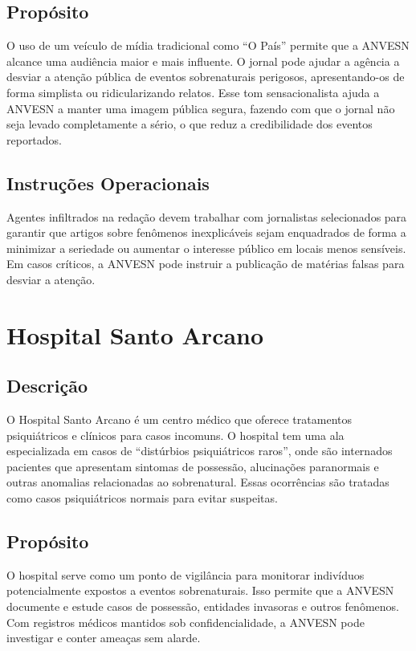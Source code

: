 \documentclass{book}
\begin{document}
\section{Propósito}
O uso de um veículo de mídia tradicional como ``O País'' permite que a ANVESN alcance uma audiência maior e mais influente. O jornal pode ajudar a agência a desviar a atenção pública de eventos sobrenaturais perigosos, apresentando-os de forma simplista ou ridicularizando relatos. Esse tom sensacionalista ajuda a ANVESN a manter uma imagem pública segura, fazendo com que o jornal não seja levado completamente a sério, o que reduz a credibilidade dos eventos reportados.

\section{Instruções Operacionais}
Agentes infiltrados na redação devem trabalhar com jornalistas selecionados para garantir que artigos sobre fenômenos inexplicáveis sejam enquadrados de forma a minimizar a seriedade ou aumentar o interesse público em locais menos sensíveis. Em casos críticos, a ANVESN pode instruir a publicação de matérias falsas para desviar a atenção.

\chapter{Hospital Santo Arcano}
\section{Descrição}
O Hospital Santo Arcano é um centro médico que oferece tratamentos psiquiátricos e clínicos para casos incomuns. O hospital tem uma ala especializada em casos de ``distúrbios psiquiátricos raros'', onde são internados pacientes que apresentam sintomas de possessão, alucinações paranormais e outras anomalias relacionadas ao sobrenatural. Essas ocorrências são tratadas como casos psiquiátricos normais para evitar suspeitas.

\section{Propósito}
O hospital serve como um ponto de vigilância para monitorar indivíduos potencialmente expostos a eventos sobrenaturais. Isso permite que a ANVESN documente e estude casos de possessão, entidades invasoras e outros fenômenos. Com registros médicos mantidos sob confidencialidade, a ANVESN pode investigar e conter ameaças sem alarde.
\end{document}
